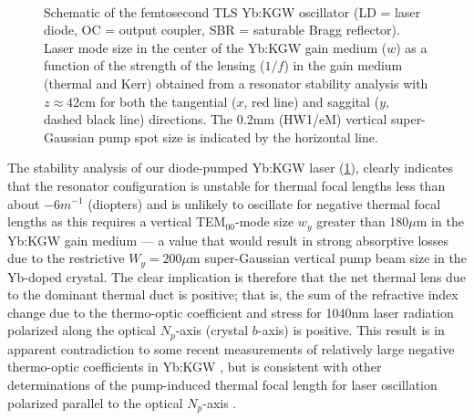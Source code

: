\begin{figure}
  \centering
  \subfloat[][]{
    \label{fig:laser_schematic}
    
  }
  \\
  \caption[Schematic and stability plot of employed Yb:KGW ultrafast laser]{
    \protect{} Schematic of the femtosecond TLS Yb:KGW oscillator (LD = laser diode, OC = output coupler, SBR = saturable Bragg reflector).
    \protect{} Laser mode size in the center of the Yb:KGW gain medium ($w$) as a function of the strength of the lensing ($1/f$) in the gain medium (thermal and Kerr) obtained from a resonator stability analysis with $z \approx 42$cm for both the tangential ($x$, red line) and saggital ($y$, dashed black line) directions.
    The 0.2mm (HW1/eM) vertical super-Gaussian pump spot size is indicated by the horizontal line.
  }
  \label{fig:laser-cavity}
\end{figure}

The stability analysis of our diode-pumped Yb:KGW laser (\ref{fig:laser-cavity}), clearly indicates that the resonator configuration is unstable for thermal focal lengths less than about $-6m^{-1}$ (diopters) and is unlikely to oscillate for negative thermal focal lengths as this requires a vertical TEM$_{00}$-mode size $w_y$ greater than 180$\mu$m in the Yb:KGW gain medium --- a value that would result in strong absorptive losses due to the restrictive $W_y = 200\mu$m super-Gaussian vertical pump beam size in the Yb-doped crystal.
The clear implication is therefore that the net thermal lens due to the dominant thermal duct is positive; that is, the sum of the refractive index change due to the thermo-optic coefficient and stress for 1040nm laser radiation polarized along the optical $N_p$-axis (crystal $b$-axis) is positive.
This result is in apparent contradiction to some recent measurements of relatively large negative thermo-optic coefficients in Yb:KGW \cite{Biswal_thermo_optical_05}, but is consistent with other determinations of the pump-induced thermal focal length for laser oscillation polarized parallel to the optical $N_p$-axis \cite{Holtom_mode_locked_2006,Hellstrom_efficient_2006}.


